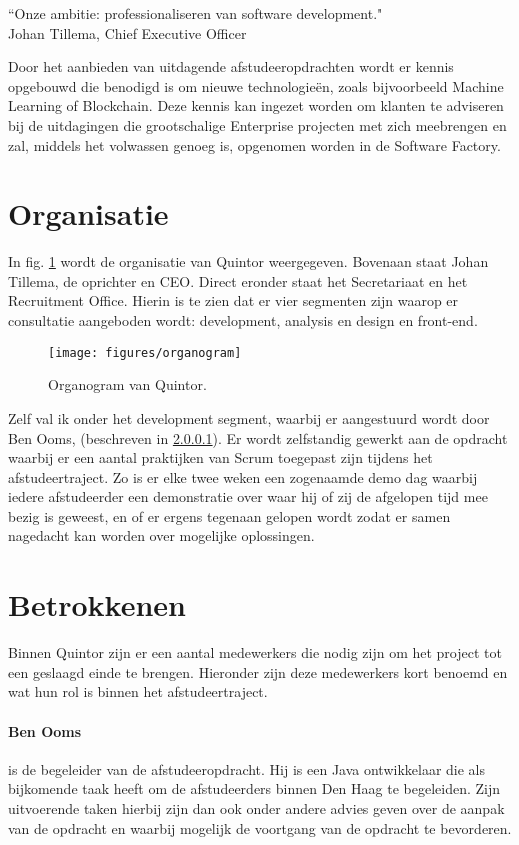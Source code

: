 \begin{formal}
  \label{visie}
  ``Onze ambitie: professionaliseren van software development."
  \\ Johan Tillema, Chief Executive Officer
\end{formal}

Door het aanbieden van uitdagende afstudeeropdrachten wordt er kennis opgebouwd die benodigd is om nieuwe technologieën, zoals bijvoorbeeld Machine Learning of Blockchain. Deze kennis kan ingezet worden om klanten te adviseren bij de uitdagingen die grootschalige Enterprise projecten met zich meebrengen en zal, middels het volwassen genoeg is, opgenomen worden in de Software Factory.

\section{Organisatie}
In fig. \ref{organogram} wordt de organisatie van Quintor weergegeven. Bovenaan staat Johan Tillema, de oprichter en CEO. Direct eronder staat het Secretariaat en het Recruitment Office. Hierin is te zien dat er vier segmenten zijn waarop er consultatie aangeboden wordt: development, analysis en design en front-end.

\begin{figure}[h]
  \texttt{[image: figures/organogram]}
  \caption{Organogram van Quintor.}
  \label{organogram}
\end{figure}

\newpage
Zelf val ik onder het development segment, waarbij er aangestuurd wordt door Ben Ooms, (beschreven in \ref{begeleider}). Er wordt zelfstandig gewerkt aan de opdracht waarbij er een aantal praktijken van Scrum toegepast zijn tijdens het afstudeertraject. Zo is er elke twee weken een zogenaamde demo dag waarbij iedere afstudeerder een demonstratie over waar hij of zij de afgelopen tijd mee bezig is geweest, en of er ergens tegenaan gelopen wordt zodat er samen nagedacht kan worden over mogelijke oplossingen.

\section{Betrokkenen}

Binnen Quintor zijn er een aantal medewerkers die nodig zijn om het project tot een geslaagd einde te brengen. Hieronder zijn deze medewerkers kort benoemd en wat hun rol is binnen het afstudeertraject.

\paragraph{Ben Ooms} \label{begeleider} is de begeleider van de afstudeeropdracht. Hij is een Java ontwikkelaar die als bijkomende taak heeft om de afstudeerders binnen Den Haag te begeleiden. Zijn uitvoerende taken hierbij zijn dan ook onder andere advies geven over de aanpak van de opdracht en waarbij mogelijk de voortgang van de opdracht te bevorderen.

